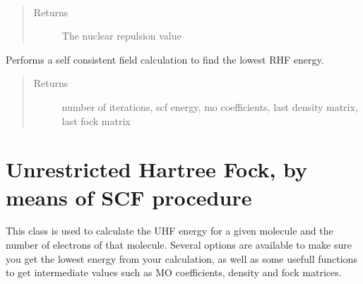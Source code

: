 \documentclass[letterpaper,10pt,english]{sphinxmanual}
\begin{document}
\begin{fulllineitems}

\begin{fulllineitems}
\label{\detokenize{RHF:ghf.RHF.RHF.nuc_rep}}~\begin{quote}\begin{description}
\item[{Returns}] \leavevmode
The nuclear repulsion value

\end{description}\end{quote}

\end{fulllineitems}


\begin{fulllineitems}
\label{\detokenize{RHF:ghf.RHF.RHF.scf}}
Performs a self consistent field calculation to find the lowest RHF energy.
\begin{quote}\begin{description}
\item[{Returns}] \leavevmode
number of iterations, scf energy, mo coefficients, last density matrix, last fock matrix

\end{description}\end{quote}

\end{fulllineitems}


\end{fulllineitems}

\label{\detokenize{UHF:module-ghf.UHF}}

\chapter{Unrestricted Hartree Fock, by means of SCF procedure}
\label{\detokenize{UHF:unrestricted-hartree-fock-by-means-of-scf-procedure}}\label{\detokenize{UHF::doc}}
This class is used to calculate the UHF energy for a given molecule and the number of electrons of that molecule.
Several options are available to make sure you get the lowest energy from your calculation, as well as some usefull
functions to get intermediate values such as MO coefficients, density and fock matrices.
\end{document}
